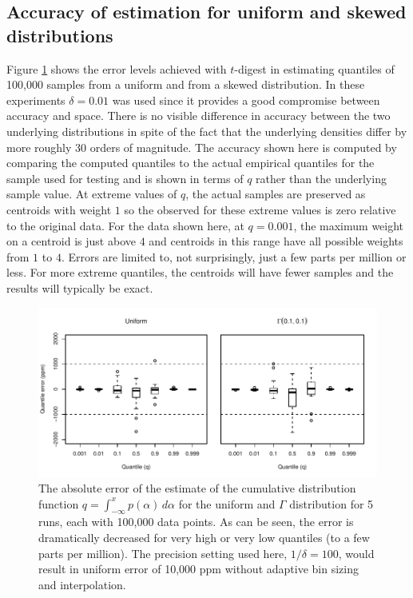 \documentclass[11pt]{amsart}
\begin{document}
\subsection{Accuracy of estimation for uniform and skewed distributions}
Figure \ref{fig:uniform-error} shows the error levels achieved with $t$-digest in estimating quantiles of 100,000 samples from a uniform and from a skewed distribution.  In these experiments $\delta=0.01$ was used since it provides a good compromise between accuracy and space.  There is no visible difference in accuracy between the two underlying distributions in spite of the fact that the underlying densities differ by more roughly 30 orders of magnitude.  The accuracy shown here is computed by comparing the computed quantiles to the actual empirical quantiles for the sample used for testing and is shown in terms of $q$ rather than the underlying sample value.  At extreme values of $q$, the actual samples are preserved as centroids with weight $1$ so the observed for these extreme values is zero relative to the original data.  For the data shown here, at $q=0.001$, the maximum weight on a centroid is just above $4$ and centroids in this range have all possible weights from $1$ to $4$.  Errors are limited to, not surprisingly, just a few parts per million or less.  For more extreme quantiles, the centroids will have fewer samples and the results will typically be exact.
\begin{figure}[htb] %
   \includegraphics[width=6in]{error.pdf} 
   \caption{The absolute error of the estimate of the cumulative distribution function $q = \int_{-\infty}^x p(\alpha) \, d\alpha$ for the uniform and $\Gamma$ distribution for 5 runs, each with 100,000 data points.  As can be seen, the error is dramatically decreased for very high or very low quantiles (to a few parts per million).  The precision setting used here, $1/\delta = 100$, would result in uniform error of 10,000 ppm without adaptive bin sizing and interpolation.}
   \label{fig:uniform-error}
\end{figure}
\end{document}
